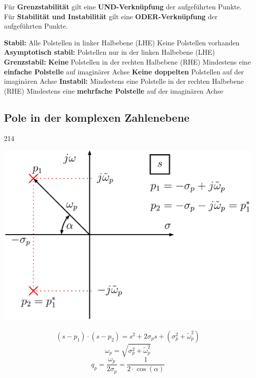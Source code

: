 Für \textbf{Grenzstabilität} gilt eine \textbf{UND-Verknüpfung} der aufgeführten Punkte. 
Für \textbf{Stabilität und Instabilität} gilt eine \textbf{ODER-Verknüpfung} der aufgeführten Punkte.

\begin{outline}
    \1 \textbf{Stabil:} 
        \2 Alle Polstellen in linker Halbebene (LHE)
        \2 Keine Polstellen vorhanden 
    \1 \textbf{Asymptotisch stabil:}
        \2 Polstellen nur in der linken Halbebene (LHE)
    \1 \textbf{Grenzstabil:} 
        \2 \textbf{Keine} Polstellen in der rechten Halbebene (RHE)
        \2 Mindestens eine \textbf{einfache Polstelle} auf imaginärer Achse
        \2 \textbf{Keine doppelten} Polstellen auf der imaginären Achse
    \1 \textbf{Instabil:} 
        \2 Mindestens eine Polstelle in der rechten Halbebene (RHE)
        \2 Mindestens eine \textbf{mehrfache Polstelle} auf der imaginären Achse
\end{outline}


\subsection{Pole in der komplexen Zahlenebene}{214}


\begin{minipage}[c]{0.45\columnwidth}
    \includegraphics[width=\columnwidth]{images/beispiel_pol_nullstellen_diagramm.png}
\end{minipage}
\hfill
\begin{minipage}[c]{0.48\columnwidth}
    $$(s - p_1) \cdot (s -p_2) = s^2 + 2 \sigma_p s + (\sigma_p^2 + \tilde{\omega}_p^2) $$
    $$ \boxed{ \omega_p = \sqrt{\sigma_p^2 + \tilde{\omega}_p^2}} $$
    $$ \boxed{ q_p = \frac{\omega_p}{2 \sigma_p} = \frac{1}{2 \cdot \cos(\alpha)}} $$
\end{minipage}

